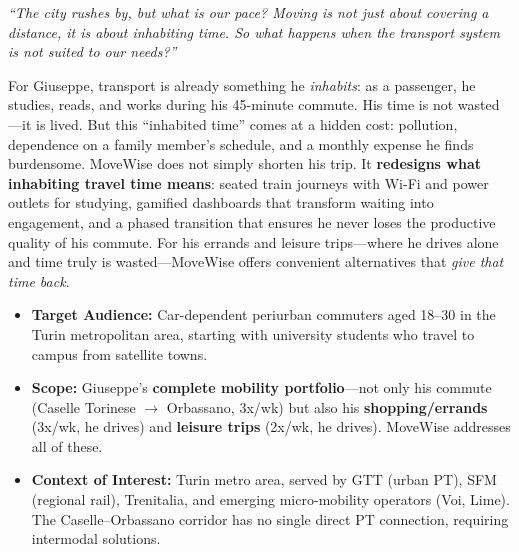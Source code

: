 \documentclass[11pt,a4paper]{article}
\begin{document}
\begin{tcolorbox}[colback=lightpurple,colframe=deeppurple,title=\textbf{Inhabiting Time: Our Response to the NEXUS 2026 Challenge}]
\textit{``The city rushes by, but what is our pace? Moving is not just about covering a distance, it is about inhabiting time. So what happens when the transport system is not suited to our needs?''}

\vspace{4pt}
For Giuseppe, transport is already something he \textit{inhabits}: as a passenger, he studies, reads, and works during his 45-minute commute. His time is not wasted---it is lived. But this ``inhabited time'' comes at a hidden cost: pollution, dependence on a family member's schedule, and a monthly expense he finds burdensome. MoveWise does not simply shorten his trip. It \textbf{redesigns what inhabiting travel time means}: seated train journeys with Wi-Fi and power outlets for studying, gamified dashboards that transform waiting into engagement, and a phased transition that ensures he never loses the productive quality of his commute. For his errands and leisure trips---where he drives alone and time truly is wasted---MoveWise offers convenient alternatives that \textit{give that time back}.
\end{tcolorbox}

\begin{tcolorbox}[colback=lightgreen,colframe=deepgreen,title=\textbf{Target Audience, Scope \& Context}]
\begin{itemize}[noitemsep]
    \item \textbf{Target Audience:} Car-dependent periurban commuters aged 18--30 in the Turin metropolitan area, starting with university students who travel to campus from satellite towns.
    \item \textbf{Scope:} Giuseppe's \textbf{complete mobility portfolio}---not only his commute (Caselle Torinese $\rightarrow$ Orbassano, 3x/wk) but also his \textbf{shopping/errands} (3x/wk, he drives) and \textbf{leisure trips} (2x/wk, he drives). MoveWise addresses all of these.
    \item \textbf{Context of Interest:} Turin metro area, served by GTT (urban PT), SFM (regional rail), Trenitalia, and emerging micro-mobility operators (Voi, Lime). The Caselle--Orbassano corridor has no single direct PT connection, requiring intermodal solutions.
\end{itemize}
\end{tcolorbox}

\end{document}
